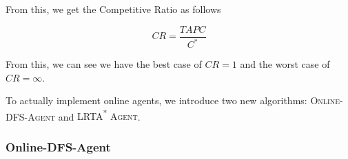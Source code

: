 From this, we get the Competitive Ratio as follows

\begin{equation*}
    CR = \frac{TAPC}{C^*}
\end{equation*}

From this, we can see we have the best case of $CR = 1$ and the worst case of $CR = \infty$.

To actually implement online agents, we introduce two new algorithms: \textsc{Online-DFS-Agent} and \textsc{LRTA\textsuperscript{*} Agent}.

\subsubsection{Online-DFS-Agent}
\begin{algorithmic}[1]
        \EndIf{}

        \State{}
        \EndIf{}

        \State{}
        \EndIf{}

            \Else{}
            \EndIf{}
        \Else{}
        \EndIf{}

        \State{}
    \EndFunction{}
\end{algorithmic}

